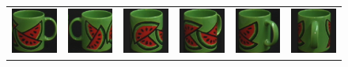 \begin{figure}[p]
\begin{tabular}{cccccc}
\includegraphics[width=2cm]{coil/beeld-30.eps} &
\includegraphics[width=2cm]{coil/beeld-31.eps} &
\includegraphics[width=2cm]{coil/beeld-32.eps} &
\includegraphics[width=2cm]{coil/beeld-33.eps} &
\includegraphics[width=2cm]{coil/beeld-34.eps} &
\includegraphics[width=2cm]{coil/beeld-35.eps} \\


\end{tabular}
\end{figure}
